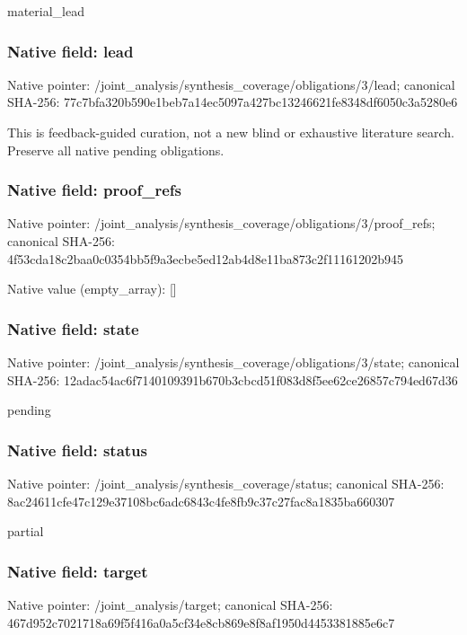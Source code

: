 \documentclass[10pt,a4paper]{article}
\begin{document}
\begingroup\raggedright\sloppy material\_\allowbreak{}lead\par\endgroup

\subsubsection{Native field: lead}
Native pointer: /joint\_\allowbreak{}analysis/synthesis\_\allowbreak{}coverage/obligations/3/lead; canonical SHA-256: 77c7bfa320b590e1beb7a14ec5097a427bc13246621fe8348df6050c3a5280e6

\begingroup\raggedright\sloppy This is feedback-guided curation,\allowbreak{} not a new blind or exhaustive literature search. Preserve all native pending obligations.\par\endgroup

\subsubsection{Native field: proof\_\allowbreak{}refs}
Native pointer: /joint\_\allowbreak{}analysis/synthesis\_\allowbreak{}coverage/obligations/3/proof\_\allowbreak{}refs; canonical SHA-256: 4f53cda18c2baa0c0354bb5f9a3ecbe5ed12ab4d8e11ba873c2f11161202b945

Native value (empty\_\allowbreak{}array): []

\subsubsection{Native field: state}
Native pointer: /joint\_\allowbreak{}analysis/synthesis\_\allowbreak{}coverage/obligations/3/state; canonical SHA-256: 12adac54ac6f7140109391b670b3cbcd51f083d8f5ee62ce26857c794ed67d36

\begingroup\raggedright\sloppy pending\par\endgroup

\subsubsection{Native field: status}
Native pointer: /joint\_\allowbreak{}analysis/synthesis\_\allowbreak{}coverage/status; canonical SHA-256: 8ac24611cfe47c129e37108bc6adc6843c4fe8fb9c37c27fac8a1835ba660307

\begingroup\raggedright\sloppy partial\par\endgroup

\subsubsection{Native field: target}
Native pointer: /joint\_\allowbreak{}analysis/target; canonical SHA-256: 467d952c7021718a69f5f416a0a5cf34e8cb869e8f8af1950d4453381885e6c7
\end{document}
